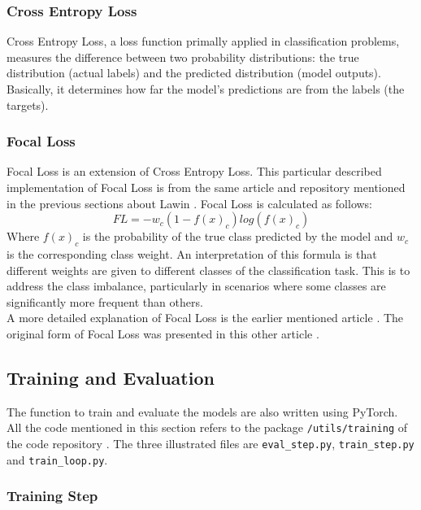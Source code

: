 \subsubsection{Cross Entropy Loss}

Cross Entropy Loss, a loss function primally applied in classification problems, measures the difference between two probability distributions: the true distribution (actual labels) and the predicted distribution (model outputs).
Basically, it determines how far the model's predictions are from the labels (the targets).

\subsubsection{Focal Loss}

Focal Loss is an extension of Cross Entropy Loss. This particular described implementation of Focal Loss is from the same article and repository mentioned in the previous sections about Lawin \cite{WeedMap-PaperThesis} \cite{WeedMap-Repository}.
Focal Loss is calculated as follows:
\begin{equation}
	FL=-w_c (1-f(x)_c ) log(f(x)_c)
\end{equation}
Where $f(x)_c$ is the probability of the true class predicted by the model and $w_c$ is the corresponding class weight.
An interpretation of this formula is that different weights are given to different classes of the classification task. This is to address the class imbalance, particularly in scenarios where some classes are significantly more frequent than others.
\\[0.3cm]A more detailed explanation of Focal Loss is the earlier mentioned article \cite{WeedMap-PaperThesis}. The original form of Focal Loss was presented in this other article \cite{FocalLoss}.

\subsection{Training and Evaluation}

The function to train and evaluate the models are also written using PyTorch.
\\[0.3cm]All the code mentioned in this section refers to the package \texttt{/utils/training} of the code repository \cite{Repository-THESIS}. The three illustrated files are \texttt{eval\_step.py}, \texttt{train\_step.py} and \texttt{train\_loop.py}.

\subsubsection{Training Step}

